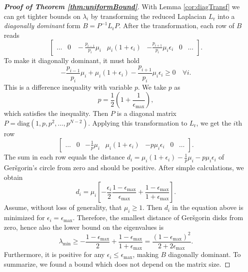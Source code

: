 \documentclass[technote, 10pt, twoside]{IEEEtran}
\newcommand{\weightGain}{\mu}
\newcommand{\wn}{i}
\newcommand{\numVeh}{N}
\newcommand{\lapl}{{L}}
\newcommand{\redLapl}{{\lapl_\mathrm{r}}}
\newcommand{\spatEig}{\lambda} \newcommand{\spatEigWn}{\lambda_\wn}
\theoremstyle{plain}
\theoremstyle{definition}
\theoremstyle{assump}
\begin{document}
\begin{proof}[\textbf{Proof of Theorem \ref{thm:uniformBound}}]
With Lemma \ref{cor:diagTransf} we can get tighter bounds on $\spatEigWn$ by transforming the reduced Laplacian $\redLapl$ into a \textit{diagonally dominant} form $B=P^{-1}\redLapl P$. After the transformation, each row of $B$ reads
\begin{equation}
	\left[
		\begin{matrix}
			 \ldots \!&\! 0 \!&\! -\frac{p_{i-1}}{p_i}\weightGain_i & \weightGain_i(1+\epsilon_i) & -\frac{p_{i+1}}{p_i}\weightGain_i \epsilon_i \!&\! 0\!&\! \ldots
		\end{matrix} 
	\right].
\end{equation}
To make it diagonally dominant, it must hold
\begin{equation}
	-\frac{p_{i-1}}{p_i}\weightGain_i + \weightGain_i(1+\epsilon_i) - \frac{p_{i+1}}{p_i}\weightGain_i \epsilon_i \geq 0 \quad \forall i. \label{eq:difEq}
\end{equation}
This is a difference inequality with variable $p$. 
We take $p$ as
\begin{equation}
	p = \frac{1}{2}\left(1+\frac{1}{\epsilon_{\max}}\right), \label{eq:p}
\end{equation}
which satisfies the inequality. Then $P$ is a diagonal matrix $P=\mathrm{diag}(1, p, p^2, \ldots,
p^{\numVeh-2})$. Applying this transformation to $\redLapl$, we get the $i$th row
	\begin{equation}
		\left[
			\begin{matrix}
				\ldots\!&\!0 \!& -\frac{1}{p}\weightGain_i & \weightGain_i(1+\epsilon_i) & -p\weightGain_i \epsilon_i & 0\!&\!\ldots
			\end{matrix} 
		\right]. \label{eq:rowP}
	\end{equation}	
The sum in each row equals the distance $d_i = \weightGain_i(1+\epsilon_i) - \frac{1}{p}\weightGain_i -p \weightGain_i\epsilon_i \label{eq:rowSum}$ of Ger\v{s}gorin's circle from zero and should be positive. After simple calculations, we obtain
\begin{equation}
	d_i = \weightGain_i \left[ -\frac{\epsilon_i}{2} \frac{1-\epsilon_{\max}}{\epsilon_{\max}}  + \frac{1-\epsilon_{\max}}{1+\epsilon_{\max}}\right].
\end{equation}
Assume, without loss of generality, that $\weightGain_i \geq 1$. Then $d_i$ in the equation above is minimized for $\epsilon_i = \epsilon_{\max}$. Therefore, the smallest distance of Ger\v{s}gorin disks from zero, hence also the lower bound on the eigenvalues is 
\begin{equation}
	\spatEig_{\min} \geq -\frac{1-\epsilon_{\max}}{2}  +
	\frac{1-\epsilon_{\max}}{1+\epsilon_{\max}} = \frac{(1-\epsilon_{\max})^2}{2+2\epsilon_{\max}}.
\end{equation}
Furthermore, it is positive for any $\epsilon_i \leq \epsilon_{\max}$, making $B$ diagonally dominant. To summarize, we found a bound which does not depend on the matrix size.
\end{proof}
\end{document}
